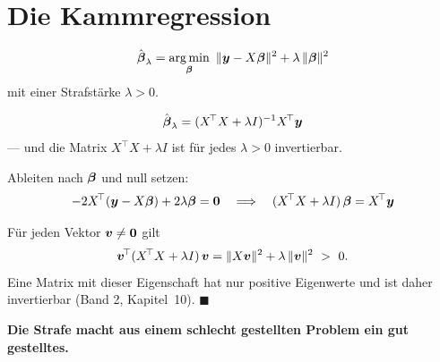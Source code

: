 \section{Die Kammregression}

\begin{definition}
\[ \hat{\boldsymbol{\beta}}_{\lambda} = \operatorname*{arg\,min}_{\boldsymbol{\beta}}\ \|\boldsymbol{y} - X\boldsymbol{\beta}\|^{2} + \lambda\,\|\boldsymbol{\beta}\|^{2} \]
mit einer Strafstärke $\lambda > 0$.
\end{definition}

\begin{merksatz}
\[ \hat{\boldsymbol{\beta}}_{\lambda} = (X^{\!\top}X + \lambda I)^{-1}X^{\!\top}\boldsymbol{y} \]
--- und die Matrix $X^{\!\top}X+\lambda I$ ist für jedes $\lambda > 0$ invertierbar.

 Ableiten nach $\boldsymbol{\beta}$ und null setzen:
\[ -2X^{\!\top}(\boldsymbol{y} - X\boldsymbol{\beta}) + 2\lambda\boldsymbol{\beta} = \boldsymbol{0} \quad\Longrightarrow\quad (X^{\!\top}X+\lambda I)\,\boldsymbol{\beta} = X^{\!\top}\boldsymbol{y} \]

 Für jeden Vektor $\boldsymbol{v} \ne \boldsymbol{0}$ gilt
\[ \boldsymbol{v}^{\!\top}(X^{\!\top}X+\lambda I)\,\boldsymbol{v} = \|X\boldsymbol{v}\|^{2} + \lambda\,\|\boldsymbol{v}\|^{2} \ >\ 0 . \]
Eine Matrix mit dieser Eigenschaft hat nur positive Eigenwerte und ist daher invertierbar (Band 2, Kapitel~10). $\blacksquare$

\begin{center}
\begin{minipage}{0.9\textwidth}
\textbf{Die Strafe macht aus einem schlecht gestellten Problem ein gut gestelltes.}
\end{minipage}
\end{center}
\end{merksatz}

